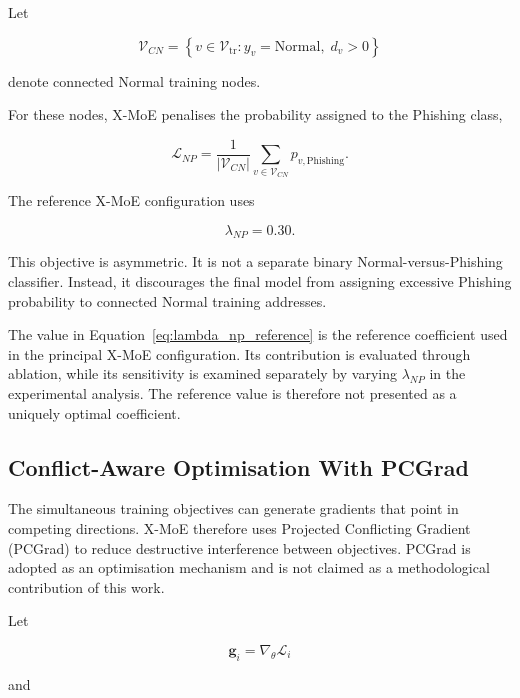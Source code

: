 \documentclass{ieeeaccess}
\begin{document}
Let

\begin{equation}
\mathcal{V}_{CN}
=
\left\{
v\in\mathcal{V}_{\mathrm{tr}}
:
y_v=\mathrm{Normal},
\;
d_v>0
\right\}
\end{equation}

denote connected Normal training nodes.

For these nodes, X-MoE penalises the probability assigned to the Phishing class,

\begin{equation}
\mathcal{L}_{NP}
=
\frac{1}{|\mathcal{V}_{CN}|}
\sum_{v\in\mathcal{V}_{CN}}
p_{v,\mathrm{Phishing}}.
\label{eq:np_penalty}
\end{equation}

The reference X-MoE configuration uses

\begin{equation}
\lambda_{NP}=0.30.
\label{eq:lambda_np_reference}
\end{equation}

This objective is asymmetric. It is not a separate binary Normal-versus-Phishing classifier. Instead, it discourages the final model from assigning excessive Phishing probability to connected Normal training addresses.

The value in Equation~\ref{eq:lambda_np_reference} is the reference coefficient used in the principal X-MoE configuration. Its contribution is evaluated through ablation, while its sensitivity is examined separately by varying \(\lambda_{NP}\) in the experimental analysis. The reference value is therefore not presented as a uniquely optimal coefficient.


\subsection{Conflict-Aware Optimisation With PCGrad}

The simultaneous training objectives can generate gradients that point in competing directions. X-MoE therefore uses Projected Conflicting Gradient (PCGrad) \cite{yu2020pcgrad} to reduce destructive interference between objectives. PCGrad is adopted as an optimisation mechanism and is not claimed as a methodological contribution of this work.

Let

\begin{equation}
\mathbf{g}_i
=
\nabla_{\theta}\mathcal{L}_i
\end{equation}

and
\end{document}
